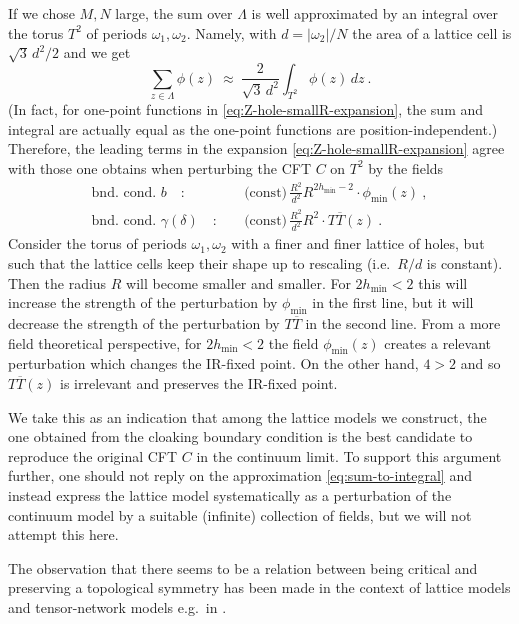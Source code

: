 \documentclass[11pt,a4paper]{article}
\numberwithin{equation}{section}
\begin{document}
\noindent
If we chose $M,N$ large, the sum over $\Lambda$ is well approximated by an integral over the torus $T^2$ of periods $\omega_1,\omega_2$. Namely, with $d = |\omega_2|/N$ the area of a lattice cell is $\sqrt{3} \, d^2/2$ and we get
\begin{equation}\label{eq:sum-to-integral}
\sum_{z \in \Lambda} \phi(z)
~\approx~
\frac{2}{\sqrt{3}\,d^2}
\int_{T^2} \phi(z) \, dz ~.
\end{equation}
(In fact, for one-point functions in \eqref{eq:Z-hole-smallR-expansion}, the sum and integral are actually equal as the one-point functions are position-independent.)
Therefore, the leading terms in the expansion \eqref{eq:Z-hole-smallR-expansion} agree with those one obtains when perturbing the CFT $C$ on $T^2$ by the fields
\begin{align}
\text{bnd. cond. } b  \quad:\quad & 
\text{(const)} \,\tfrac{R^2}{d^2} R^{2 h_\mathrm{min}-2} \cdot \phi_\mathrm{min}(z) ~,
\nonumber \\
\text{bnd. cond. } \gamma(\delta) \quad:\quad & 
\text{(const)} \,\tfrac{R^2}{d^2} R^{2} \cdot T\overline T(z) ~.
\end{align}
%
Consider the torus of periods $\omega_1,\omega_2$ with a finer and finer lattice of holes, but such that the lattice cells keep their shape up to rescaling (i.e.\ $R/d$ is constant). Then the radius $R$ will become smaller and smaller. For $2h_\mathrm{min}<2$ this will increase the strength of the perturbation by $\phi_\mathrm{min}$ in the first line, but it will decrease the strength of the perturbation by $T\overline T$ in the second line.
From a more field theoretical perspective,
for $2h_\mathrm{min}<2$ the field $\phi_\mathrm{min}(z)$ creates a relevant perturbation which changes the IR-fixed point. On the other hand, $4>2$ and so $T\overline T(z)$ is irrelevant and preserves the IR-fixed point. 

We take this as an indication that among the lattice models we construct, the one obtained from the cloaking boundary condition is the best candidate to reproduce the original CFT $C$ in the continuum limit.
To support this argument further, one should not reply on the approximation \eqref{eq:sum-to-integral} and instead express the lattice model systematically as a perturbation of the continuum model by a suitable (infinite) collection of fields, but we will not attempt this here.

\medskip
The observation that there seems to be a relation between being critical and preserving a topological symmetry has been made in the context of lattice models and tensor-network models e.g.\ in \cite{PhysRevB.82.115126,Aasen:2016dop,Aasen:2020jwb,Vanhove:2018wlb}.
\end{document}
